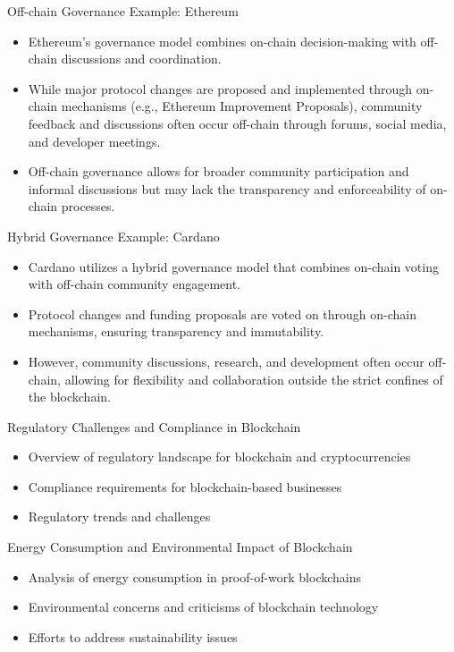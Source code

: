 \begin{withoutheadline}
\begin{frame}{Off-chain Governance Example: Ethereum}
    \begin{itemize}
        \item Ethereum's governance model combines on-chain decision-making with off-chain discussions and coordination.
        \item While major protocol changes are proposed and implemented through on-chain mechanisms (e.g., Ethereum Improvement Proposals), community feedback and discussions often occur off-chain through forums, social media, and developer meetings.
        \item Off-chain governance allows for broader community participation and informal discussions but may lack the transparency and enforceability of on-chain processes.
    \end{itemize}
\end{frame}

\begin{frame}{Hybrid Governance Example: Cardano}
    \begin{itemize}
        \item Cardano utilizes a hybrid governance model that combines on-chain voting with off-chain community engagement.
        \item Protocol changes and funding proposals are voted on through on-chain mechanisms, ensuring transparency and immutability.
        \item However, community discussions, research, and development often occur off-chain, allowing for flexibility and collaboration outside the strict confines of the blockchain.
    \end{itemize}
\end{frame}

\begin{frame}{Regulatory Challenges and Compliance in Blockchain}
    \begin{itemize}
        \item Overview of regulatory landscape for blockchain and cryptocurrencies
        \item Compliance requirements for blockchain-based businesses
        \item Regulatory trends and challenges
    \end{itemize}
\end{frame}

\begin{frame}{Energy Consumption and Environmental Impact of Blockchain}
    \begin{itemize}
        \item Analysis of energy consumption in proof-of-work blockchains
        \item Environmental concerns and criticisms of blockchain technology
        \item Efforts to address sustainability issues
    \end{itemize}
\end{frame}


\end{withoutheadline}

